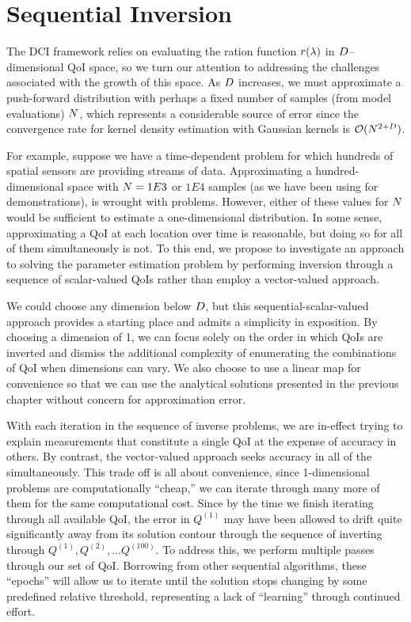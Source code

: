
\section{Sequential Inversion}\label{sec:ch05-sequential}

The DCI framework relies on evaluating the ration function $r(\lambda)$ in $D$--dimensional QoI space, so we turn our attention to addressing the challenges associated with the growth of this space.
As $D$ increases, we must approximate a push-forward distribution with perhaps a fixed number of samples (from model evaluations) $N$, which represents a considerable source of error since the convergence rate for kernel density estimation with Gaussian kernels is $\mathcal{O} (N^{2+D})$.

For example, suppose we have a time-dependent problem for which hundreds of spatial sensors are providing streams of data.
Approximating a hundred-dimensional space with $N = 1E3$ or $1E4$ samples (as we have been using for demonstrations), is wrought with problems.
However, either of these values for $N$ would be sufficient to estimate a one-dimensional distribution.
In some sense, approximating a QoI at each location over time is reasonable, but doing so for all of them simultaneously is not.
To this end, we propose to investigate an approach to solving the parameter estimation problem by performing inversion through a sequence of scalar-valued QoIs rather than employ a vector-valued approach.

We could choose any dimension below $D$, but this sequential-scalar-valued approach provides a starting place and admits a simplicity in exposition.
By choosing a dimension of 1, we can focus solely on the order in which QoIs are inverted and dismiss the additional complexity of enumerating the combinations of QoI when dimensions can vary.
We also choose to use a linear map for convenience so that we can use the analytical solutions presented in the previous chapter without concern for approximation error.

With each iteration in the sequence of inverse problems, we are in-effect trying to explain measurements that constitute a single QoI at the expense of accuracy in others.
By contrast, the vector-valued approach seeks accuracy in all of the simultaneously.
This trade off is all about convenience, since 1-dimensional problems are computationally ``cheap,'' we can iterate through many more of them for the same computational cost.
Since by the time we finish iterating through all available QoI, the error in $Q^{(1)}$ may have been allowed to drift quite significantly away from its solution contour through the sequence of inverting through $Q^{(1)}, Q^{(2)}, \dots Q^{(100)}$.
To address this, we perform multiple passes through our set of QoI.
Borrowing from other sequential algorithms, these ``epochs'' will allow us to iterate until the solution stops changing by some predefined relative threshold, representing a lack of ``learning'' through continued effort.


